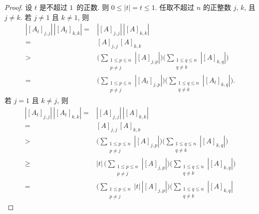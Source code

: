 \begin{proof}
    设 \(t\) 是不超过 \(1\)~的正数.
    则 \(0 \leq |t| = t \leq 1\).
    任取不超过 \(n\) 的正整数 \(j\), \(k\),
    且 \(j \neq k\).
    若 \(j \neq 1\) 且 \(k \neq 1\), 则
    \begin{align*}
        |[A_t]_{j,j}|\,|[A_t]_{k,k}|
        = {} &
        |[A]_{j,j}|\,|[A]_{k,k}|
        \\
        = {} &
        [A]_{j,j}\,[A]_{k,k}
        \\
        > {} &
        \Bigg(
        \sum_{\substack{1 \leq p \leq n \\
                p \neq j}} {|[A]_{j,p}|}
        \Bigg)
        \Bigg(
        \sum_{\substack{1 \leq q \leq n \\
                q \neq k}} {|[A]_{k,q}|}
        \Bigg)
        \\
        = {} &
        \Bigg(
        \sum_{\substack{1 \leq p \leq n \\
                p \neq j}} {|[A_t]_{j,p}|}
        \Bigg)
        \Bigg(
        \sum_{\substack{1 \leq q \leq n \\
                q \neq k}} {|[A_t]_{k,q}|}
        \Bigg).
    \end{align*}
    若 \(j = 1\) 且 \(k \neq j\), 则
    \begin{align*}
        |[A_t]_{j,j}|\,|[A_t]_{k,k}|
        = {}    &
        |[A]_{j,j}|\,|[A]_{k,k}|
        \\
        = {}    &
        [A]_{j,j}\,[A]_{k,k}
        \\
        > {}    &
        \Bigg(
        \sum_{\substack{1 \leq p \leq n \\
                p \neq j}} {|[A]_{j,p}|}
        \Bigg)
        \Bigg(
        \sum_{\substack{1 \leq q \leq n \\
                q \neq k}} {|[A]_{k,q}|}
        \Bigg)
        \\
        \geq {} &
        |t|\,\Bigg(
        \sum_{\substack{1 \leq p \leq n \\
                p \neq j}} {|[A]_{j,p}|}
        \Bigg)
        \Bigg(
        \sum_{\substack{1 \leq q \leq n \\
                q \neq k}} {|[A]_{k,q}|}
        \Bigg)
        \\
        = {}    &
        \Bigg(
        \sum_{\substack{1 \leq p \leq n \\
                p \neq j}} {|t|\,|[A]_{j,p}|}
        \Bigg)
        \Bigg(
        \sum_{\substack{1 \leq q \leq n \\
                q \neq k}} {|[A]_{k,q}|}

\end{align*}
\end{proof}
